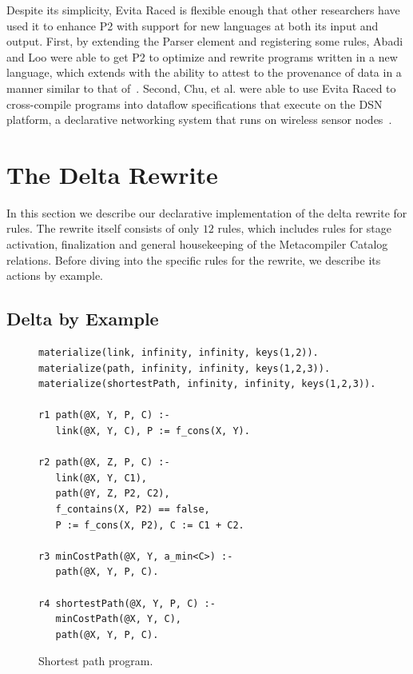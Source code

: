Despite its simplicity, Evita Raced is flexible enough that other researchers
have used it to enhance P2 with support for new languages at both its input and
output.  First, by extending the Parser element and registering some \OVERLOG
rules, Abadi and Loo were able to get P2 to optimize and rewrite programs
written in a new language, which extends \OVERLOG with the ability to attest to
the provenance of data in a manner similar to that of~\cite{abadi-netdb07}.
Second, Chu, et al. were able to use Evita Raced to cross-compile \OVERLOG programs
into dataflow specifications that execute on the DSN platform, a declarative
networking system that runs on wireless sensor nodes~\cite{chu-sensys07}.


\section{The Delta Rewrite}
\label{ch:evita:sec:delta}

In this section we describe our declarative implementation of the delta rewrite
for \OVERLOG rules.  The rewrite itself consists of only $12$ rules, which
includes rules for stage activation, finalization and general housekeeping of
the Metacompiler Catalog relations.  Before diving into the specific rules for
the rewrite, we describe its actions by example.

\subsection{Delta by Example}

\begin{figure}[!t]
\ssp
\centering
\begin{lstlisting}
materialize(link, infinity, infinity, keys(1,2)).
materialize(path, infinity, infinity, keys(1,2,3)).
materialize(shortestPath, infinity, infinity, keys(1,2,3)).
  
r1 path(@X, Y, P, C) :- 
   link(@X, Y, C), P := f_cons(X, Y).

r2 path(@X, Z, P, C) :-
   link(@X, Y, C1), 
   path(@Y, Z, P2, C2),
   f_contains(X, P2) == false,
   P := f_cons(X, P2), C := C1 + C2.

r3 minCostPath(@X, Y, a_min<C>) :-
   path(@X, Y, P, C).

r4 shortestPath(@X, Y, P, C) :-
   minCostPath(@X, Y, C), 
   path(@X, Y, P, C).

\end{lstlisting}
\caption{\label{ch:evita:fig:basicSP}Shortest path program.}
\end{figure}

